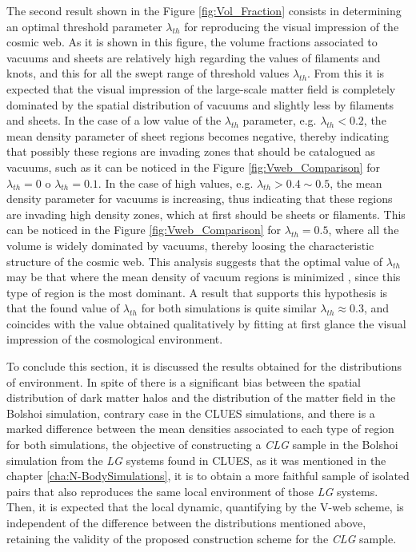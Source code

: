 The second result shown in the Figure \ref{fig:Vol_Fraction} consists in
determining an optimal threshold parameter $\lambda_{th}$ for reproducing
the visual impression of the cosmic web. As it is shown in this figure,
the volume fractions associated to vacuums and sheets are relatively high
regarding the values of filaments and knots, and this for all the swept 
range of threshold values $\lambda_{th}$. From this it is expected that 
the visual impression of the large-scale matter field is completely 
dominated by the spatial distribution of vacuums and slightly less by 
filaments and sheets. In the case of a low value of the $\lambda_{th}$ 
parameter, e.g. $\lambda_{th}<0.2$, the mean density parameter of sheet 
regions becomes negative, thereby indicating that possibly these regions 
are invading zones that should be catalogued as vacuums, such as it can be 
noticed in the Figure \ref{fig:Vweb_Comparison} for $\lambda_{th} = 0$ o 
$\lambda_{th} = 0.1$. In the case of high values, e.g. $\lambda_{th} > 
0.4\sim 0.5$, the mean density parameter for vacuums is increasing, thus 
indicating that these regions are invading high density zones, which at 
first should be sheets or filaments. This can be noticed in the Figure 
\ref{fig:Vweb_Comparison} for $\lambda_{th} = 0.5$, where all the volume 
is widely dominated by vacuums, thereby loosing the characteristic 
structure of the cosmic web. This analysis suggests that the optimal value
of $\lambda_{th}$ may be that where the mean density of vacuum regions is 
minimized , since this type of region is the most dominant. A result that 
supports this hypothesis is that the found value of $\lambda_{th}$ for 
both simulations is quite similar $\lambda_{th}\approx 0.3$, and 
coincides with the value obtained qualitatively by fitting at first glance 
the visual impression of the cosmological environment.


To conclude this section, it is discussed the results obtained for the 
distributions of environment. In spite of there is a significant bias 
between the spatial distribution of dark matter halos and the distribution
of the matter field in the Bolshoi simulation, contrary case in the CLUES 
simulations, and there is a marked difference between the mean densities
associated to each type of region for both simulations, the objective of 
constructing a \textit{CLG} sample in the Bolshoi simulation from the 
\textit{LG} systems found in CLUES, as it was mentioned in the chapter 
\ref{cha:N-BodySimulations}, it is to obtain a more faithful sample of 
isolated pairs that also reproduces the same local environment of those
\textit{LG} systems. Then, it is expected that the local dynamic, 
quantifying by the V-web scheme, is independent of the difference between
the distributions mentioned above, retaining the validity of the proposed
construction scheme for the \textit{CLG} sample.



